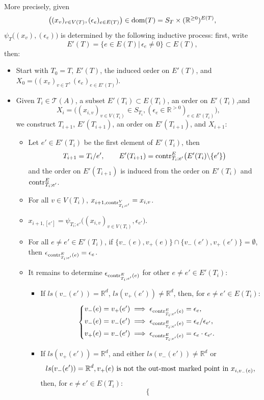 \documentclass[11pt]{article}
\theoremstyle{definition}
\theoremstyle{remark}
\def\R{\mathbb{R}}
\def\cT{\mathcal{T}}
\def\tn#1{\textnormal{#1}}
\begin{document}
More precisely, given $$\big((x_v)_{v\in V(T)},(\epsilon_{e})_{e\in E(T)}\big)\in\tn{dom}(T)=S_T\times(\R^{\ge0})^{E(T)},$$ 
$\psi_T\big((x_v),(\epsilon_{e})\big)$ is determined by the following inductive process: 
first, write 
$$E'(T)=\{e\in E(T)\big|\,\epsilon_e\neq0\}\subset E(T),$$
then: 
\begin{itemize}
\item Start with $T_0=T$, $E'(T)$, the induced order on $E'(T)$, and $X_0=\big((x_v)_{v\in T},(\epsilon_{e})_{e\in E'(T)}\big)$. 
\item Given $T_i\in\cT(A)$, a subset $E'(T_i)\subset E(T_i)$, an order on $E'(T_i)$,and $$X_i=\big((x_{i,v})_{v\in V(T_i)}\in S_{T_i},(\epsilon_{e}\in\R^{>0})_{e\in E'(T_i)}\big),$$ we construct $T_{i+1}$, $E'(T_{i+1})$, an order on $E'(T_{i+1})$, and $X_{i+1}$: 
\begin{itemize}
\item Let $e'\in E'(T_i)$ be the first element of $E'(T_i)$, then
$$T_{i+1}=T_i/e',\qquad E'(T_{i+1})=\tn{contr}^E_{T_i;e'}\big(E'(T_i)\backslash\{e'\}\big)$$
and the order on $E'(T_{i+1})$ is induced from the order on $E'(T_i)$ and $\tn{contr}^E_{T_i;e'}$.  
\item For all $v\in V(T_i)$, $x_{i+1,\tn{contr}^V_{T_i;e'}}=x_{i,v}$. 
\item $x_{i+1,[e']}=\psi_{T_i;e'}\big((x_{i,v})_{v\in V(T_i)},\epsilon_{e'}\big)$.
\item For all $e\neq e'\in E'(T_i)$, if $\{v_-(e),v_+(e)\}\cap \{v_-(e'),v_+(e')\}=\emptyset$, then $\epsilon_{\tn{contr}^E_{T_i;e'}(e)}=\epsilon_e$. 
\item It remains to determine $\epsilon_{\tn{contr}^E_{T_i;e'}(e)}$ for other $e\neq e'\in E'(T_i)$: 
\begin{itemize}
\item If $ls(v_-(e'))=\R^d$, $ls(v_+(e'))\neq\R^d$, then, for $e\neq e'\in E(T_i)$: 
$$\begin{cases}
v_-(e)=v_+(e')\implies \epsilon_{\tn{contr}^E_{T_i;e'}(e)}=\epsilon_e,\\
v_-(e)=v_-(e')\implies \epsilon_{\tn{contr}^E_{T_i;e'}(e)}=\epsilon_e/\epsilon_{e'},\\ 
v_+(e)=v_-(e')\implies \epsilon_{\tn{contr}^E_{T_i;e'}(e)}=\epsilon_e\cdot\epsilon_{e'}.
\end{cases}$$
\item If $ls(v_+(e'))=\R^d$, and either $ls(v_-(e'))\neq\R^d$ or 
$$ls(v_-(e'))=\R^d, v_+(e)\tn{ is not the out-most marked point in }x_{i,v_-(e)},$$  
then, for $e\neq e'\in E(T_i)$: 
$$\begin{cases}

\end{cases}$$
\end{itemize}
\end{itemize}
\end{itemize}
\end{document}
